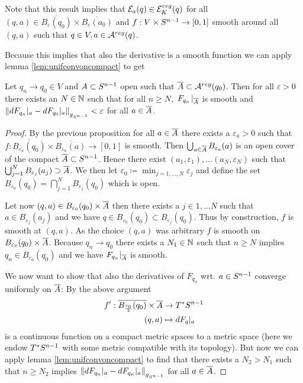 Note that this result implies that ${\mathcal{E}}_a(q)\in {{\mathcal{E}}^{reg}_K}(q)$ for all $(q,a)\in \overline{B_\varepsilon(q_0)}\times\overline{B_\varepsilon(a_0)}$ and $f:V\times {S^{n-1}} \to [0,1]$ smooth around all $(q,a)$ such that $q\in V, a\in {{\mathcal{A}}^{reg}}(q)$.

Because this implies that also the derivative is a smooth function we can apply lemma \ref{lem:unifconvoncompact} to get
\begin{proposition}\label{prop:dfunifconv}
    Let $q_n\to q_0\in V$ and $A\subset {S^{n-1}}$ open such that ${\overline{A}}\subset {{\mathcal{A}}^{reg}}(q_0)$. Then for all $\varepsilon>0$ there exists an $N\in \mathbb{N}$ such that for all $n \ge N$,  $\left.F_{q_n}\right.\rvert_{\overline{A}}$ is smooth and $\left\lVert dF_{q_n}\rvert_{a} - dF_{q_0}\rvert_{a}\right\rVert_{g_{{S^{n-1}}}}<\varepsilon$ for all $a\in {\overline{A}}$.
\end{proposition}
\begin{proof}
    By the previous proposition for all $a\in {\overline{A}}$ there exists a $\varepsilon_a>0$ such that $f:\overline{B_{\varepsilon_a}(q_0)}\times\overline{B_{\varepsilon_a}(a)}\to [0,1]$ is smooth. Then $\bigcup_{a\in {\overline{A}}} B_{\varepsilon_a}(a)$ is an open cover of the compact ${\overline{A}}\subset {S^{n-1}}$. Hence there exist $(a_1,\varepsilon_1),\dots (a_N,\varepsilon_N)$ such that $\bigcup_{j=1}^N B_{\varepsilon_j}(a_j) \supset {\overline{A}}$. We then let $\varepsilon_0 \coloneqq  \min_{j=1,\dots, N} \varepsilon_j$ and define the set $B_{\varepsilon_0}(q_0) = \bigcap_{j=1}^N B_{\varepsilon_j}(q_0)$ which is open. 

    Let now $(q,a) \in B_{\varepsilon_0}(q_0)\times{\overline{A}}$ then there exists a $j\in {1,\dots N}$ such that $a\in B_{\varepsilon_j}(a_j)$ and we have $q\in B_{\varepsilon_0}(q_0)\subset B_{\varepsilon_j}(q_0)$. Thus by construction, $f$ is smooth at $(q,a)$. As the choice $(q,a)$ was arbitrary $f$ is smooth on $B_{\varepsilon_0}(q_0)\times{\overline{A}}$. Because $q_n\to q_0$ there exists a $N_1\in \mathbb{N}$ such that $n\ge N$ implies $q_n\in B_{\varepsilon_0}(q_0)$ and we have $F_{q_n}\rvert_{{\overline{A}}}$ is smooth.

    We now want to show that also the derivatives of $F_{q_n}$ wrt. $a\in {S^{n-1}}$ converge uniformly on ${\overline{A}}$:
    By the above argument 
    \begin{align*}
        f':{\overline{B_{\frac{\varepsilon_0}{2}}(q_0)}}\times {\overline{A}} &\to T^*{S^{n-1}} \\
        (q,a)&\mapsto dF_q\rvert_a
    \end{align*}
    is a continuous function on a compact metric spaces to a metric space (here we endow $T^*{S^{n-1}}$ with some metric compatible with its topology). 
    But now we can apply lemma \ref{lem:unifconvoncompact} to find that there exists a $N_2>N_1$ such that $n\ge N_2$ implies $\left\lVert dF_{q_n}\rvert_{a} - dF_{q_n}\rvert_{a}\right\rVert_{g_{{S^{n-1}}}}$ for all $a\in {\overline{A}}$.
\end{proof}

